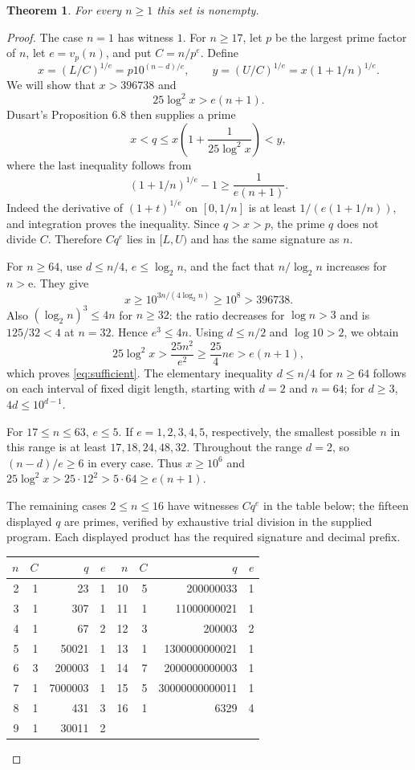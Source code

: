 \documentclass[10pt]{article}
\newtheorem{theorem}{Theorem}
\begin{document}
\begin{theorem}\label{thm:exist}
For every $n\ge1$ this set is nonempty.
\end{theorem}
\begin{proof}
The case $n=1$ has witness $1$. For $n\ge17$, let $p$ be the largest
prime factor of $n$, let $e=v_p(n)$, and put $C=n/p^e$. Define
\[
 x=(L/C)^{1/e}=p10^{(n-d)/e},\qquad
 y=(U/C)^{1/e}=x(1+1/n)^{1/e}.
\]
We will show that $x>396738$ and
\begin{equation}\label{eq:sufficient}
 25\log^2x>e(n+1).
\end{equation}
Dusart's Proposition 6.8 \cite{dusart} then supplies a prime
\[
 x<q\le x\left(1+\frac{1}{25\log^2x}\right)<y,
\]
where the last inequality follows from
\[
 (1+1/n)^{1/e}-1\ge\frac{1}{e(n+1)}.
\]
Indeed the derivative of $(1+t)^{1/e}$ on $[0,1/n]$ is at least
$1/(e(1+1/n))$, and integration proves the inequality. Since $q>x>p$,
the prime $q$ does not divide $C$. Therefore $Cq^e$ lies in $[L,U)$
and has the same signature as $n$.

For $n\ge64$, use $d\le n/4$, $e\le\log_2 n$, and the fact that
$n/\log_2n$ increases for $n>\mathrm e$. They give
\[
 x\ge10^{3n/(4\log_2n)}\ge10^8>396738.
\]
Also $(\log_2n)^3\le4n$ for $n\ge32$: the ratio decreases for
$\log n>3$ and is $125/32<4$ at $n=32$. Hence $e^3\le4n$.
Using $d\le n/2$ and $\log10>2$, we obtain
\[
 25\log^2x>\frac{25n^2}{e^2}
 \ge\frac{25}{4}ne>e(n+1),
\]
which proves \eqref{eq:sufficient}. The elementary inequality
$d\le n/4$ for $n\ge64$ follows on each interval of fixed digit length,
starting with $d=2$ and $n=64$; for $d\ge3$, $4d\le10^{d-1}$.

For $17\le n\le63$, $e\le5$. If $e=1,2,3,4,5$, respectively,
the smallest possible $n$ in this range is at least
$17,18,24,48,32$. Throughout the range $d=2$, so
$(n-d)/e\ge6$ in every case. Thus $x\ge10^6$ and
$25\log^2x>25\cdot12^2>5\cdot64\ge e(n+1)$.

The remaining cases $2\le n\le16$ have witnesses $Cq^e$ in the table
below; the fifteen displayed $q$ are primes, verified by exhaustive
trial division in the supplied program. Each displayed product has
the required signature and decimal prefix.
\begin{center}\small
\begin{tabular}{rrrr|rrrr}
\toprule
$n$&$C$&$q$&$e$&$n$&$C$&$q$&$e$\\\midrule
2&1&23&1&10&5&200000033&1\\
3&1&307&1&11&1&11000000021&1\\
4&1&67&2&12&3&200003&2\\
5&1&50021&1&13&1&1300000000021&1\\
6&3&200003&1&14&7&2000000000003&1\\
7&1&7000003&1&15&5&30000000000011&1\\
8&1&431&3&16&1&6329&4\\
9&1&30011&2&&&&\\\bottomrule
\end{tabular}
\end{center}
\end{proof}
\end{document}
